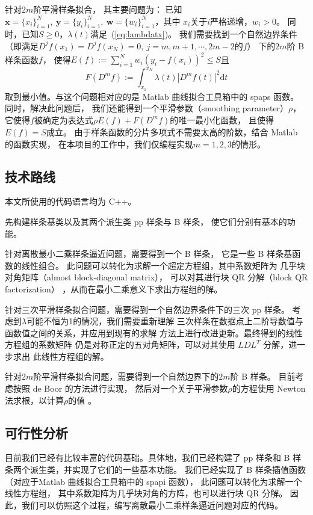 针对$2m$阶平滑样条拟合，
其主要问题为：
已知$\mathbf{x}=\{x_{i}\}_{i=1}^{N},\ \mathbf{y}=\{y_{i}\}_{i=1}^{N},
\ \mathbf{w}=\{w_{i}\}_{i=1}^{N}$，其中
$x_{i}$关于$i$严格递增，$w_{i}>0$。
同时，已知$S\ge 0$，$\lambda(t)$满足~(\ref{eq:lambdatx})。
我们需要找到一个自然边界条件
（即满足$D^{j}f(x_{1})=D^{j}f(x_{N})=0,\ j=m,m+1,\cdots,2m-2$的$f$）
下的$2m$阶 B 样条函数$f$，
使得$E(f):=\sum_{i=1}^{N}w_{i}(y_{i}-f(x_{i}))^{2}\le S$且
\begin{equation}
  \label{eq:FDmf}
  F(D^{m}f):=\int_{x_{1}}^{x_{N}}\lambda(t)|D^{m}f(t)|^{2}\mathrm{d}t
\end{equation}
取到最小值。与这个问题相对应的是 Matlab 曲线拟合工具箱中的 spaps 函数。
同时，解决此问题后，
我们还能得到一个平滑参数（smoothing parameter）$\rho$，
它使得$f$被确定为表达式$\rho E(f) + F(D^m f)$的唯一最小化函数，
且使得$E(f)=S$成立。
由于样条函数的分片多项式不需要太高的阶数，结合 Matlab 的函数实现，
在本项目的工作中，我们仅编程实现$m=1,2,3$的情形。

\subsection{技术路线}
本文所使用的代码语言均为 C++。

先构建样条基类以及其两个派生类 pp 样条与 B 样条，
使它们分别有基本的功能。

针对离散最小二乘样条逼近问题，需要得到一个 B 样条，
它是一些 B 样条基函数的线性组合。
此问题可以转化为求解一个超定方程组，其中系数矩阵为
几乎块对角矩阵（almost block-diagonal matrix），
可以对其进行块 QR 分解（block QR factorization）
\cite{Boor1976SOLVEBLOKAP}，从而在最小二乘意义下求出方程组的解。

针对三次平滑样条拟合问题，需要得到一个自然边界条件下的三次 pp 样条。
考虑到$\lambda$可能不恒为1的情况，我们需要重新理解
三次样条在数据点上二阶导数值与函数值之间的关系，并应用到现有的求解
方法\cite{GuideToSplines}上进行改进更新。最终得到的线性方程组的系数矩阵
仍是对称正定的五对角矩阵，可以对其使用 $LDL^{T}$ 分解，进一步求出
此线性方程组的解。

针对$2m$阶平滑样条拟合问题，需要得到一个自然边界下的$2m$阶 B 样条。
目前考虑按照 de Boor \cite{Boor2001CALCULATIONOT}的方法进行实现，
然后对一个关于平滑参数$\rho$的方程使用 Newton 法求根，以计算$\rho$的值
\cite{SmoothingBySplineFunctions}。

\subsection{可行性分析}
目前我们已经有比较丰富的代码基础。具体地，我们已经构建了
pp 样条和 B 样条两个派生类，并实现了它们的一些基本功能。
我们已经实现了
B 样条插值函数（对应于Matlab 曲线拟合工具箱中的 spapi 函数），
此问题可以转化为求解一个线性方程组，
其中系数矩阵为几乎块对角的方阵，也可以进行块 QR 分解。
因此，我们可以仿照这个过程，编写离散最小二乘样条逼近问题对应的代码。

